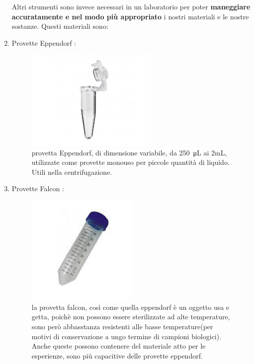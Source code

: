 \documentclass{article}
\begin{document}
\begin{enumerate}
\begin{figure}[H]
		\end{figure}

		\vspace{0.5cm}

Altri strumenti sono invece necessari in un laboratorio per poter \textbf{maneggiare accuratamente e nel modo più appropriato} i nostri materiali e le nostre sostanze. Questi materiali sono:
		\vspace{0.5cm}



		\item Provette Eppendorf :

		\begin{figure}[H]

			\includegraphics[width=0.6\textwidth]{./immagini/eppendorf.jpg}
			\caption{provetta Eppendorf, di dimensione variabile, da \SI{250}{\micro\liter} ai 2mL,
			utilizzate come provette monouso per piccole quantità di liquido. Utili nella centrifugazione.}
			\label{eppendorf}

		\end{figure}

		\vspace{0.5cm}


		\item Provette Falcon :

		\begin{figure}[H]

			\includegraphics[width=0.5\textwidth]{./immagini/falcon.jpeg}
			\caption{la provetta falcon, così come quella eppendorf è un oggetto usa e getta, poichè non possono essere sterilizzate ad alte temperature,
			sono però abbasstanza resistenti alle basse temperature(per motivi di conservazione a ungo termine di campioni biologici). Anche queste
			possono contenere del materiale atto per le esperienze, sono più capacitive delle provette eppendorf.}
			\label{falcon}


\end{figure}
\end{enumerate}
\end{document}
